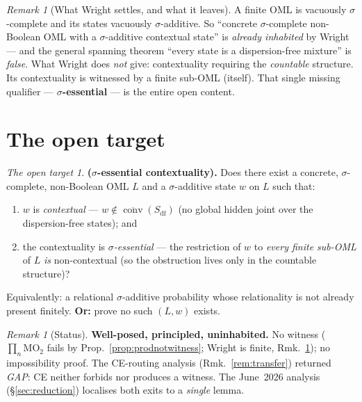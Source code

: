 \documentclass[11pt]{article}
\theoremstyle{definition}
\theoremstyle{remark}
\newtheorem{remark}[theorem]{Remark}
\newtheorem*{target}{The open target}
\newcommand{\MOO}{\mathrm{MO}_2}
\newcommand{\df}{\mathrm{df}}            %
\newcommand{\conv}{\overline{\operatorname{conv}}}
\begin{document}
\begin{remark}[What Wright settles, and what it leaves]\label{rem:wright}
A finite OML is vacuously $\sigma$-complete and its states vacuously $\sigma$-additive.
So ``concrete $\sigma$-complete non-Boolean OML with a $\sigma$-additive contextual
state'' is \emph{already inhabited} by Wright --- and the general spanning theorem
``every state is a dispersion-free mixture'' is \emph{false}. What Wright does
\emph{not} give: contextuality requiring the \emph{countable} structure. Its
contextuality is witnessed by a finite sub-OML (itself). That single missing
qualifier --- \textbf{$\sigma$-essential} --- is the entire open content.
\end{remark}

\section{The open target}\label{sec:target}

\begin{mdframed}[backgroundcolor=black!5,linewidth=0.8pt]
\begin{target}
\textbf{($\sigma$-essential contextuality).} Does there exist a concrete,
$\sigma$-complete, non-Boolean OML $L$ and a $\sigma$-additive state $w$ on $L$ such
that:
\begin{enumerate}[label=\textup{(\arabic*)},nosep]
  \item $w$ is \emph{contextual} --- $w\notin\conv(S_{\df})$ (no global hidden
    joint over the dispersion-free states); and
  \item the contextuality is \emph{$\sigma$-essential} --- the restriction of $w$
    to \emph{every finite sub-OML} of $L$ \emph{is} non-contextual (so the
    obstruction lives only in the countable structure)?
\end{enumerate}
Equivalently: a relational $\sigma$-additive probability whose relationality is not
already present finitely. \textbf{Or:} prove no such $(L,w)$ exists.
\end{target}
\end{mdframed}

\begin{remark}[Status]\label{rem:status}
\textbf{Well-posed, principled, uninhabited.} No witness ($\prod_n\MOO$ fails by
Prop.~\ref{prop:prodnotwitness}; Wright is finite, Rmk.~\ref{rem:wright}); no
impossibility proof. The CE-routing analysis (Rmk.~\ref{rem:transfer}) returned
\emph{GAP}: CE neither forbids nor produces a witness. The June~2026 analysis
(\S\ref{sec:reduction}) localises both exits to a \emph{single} lemma.
\end{remark}
\end{document}
